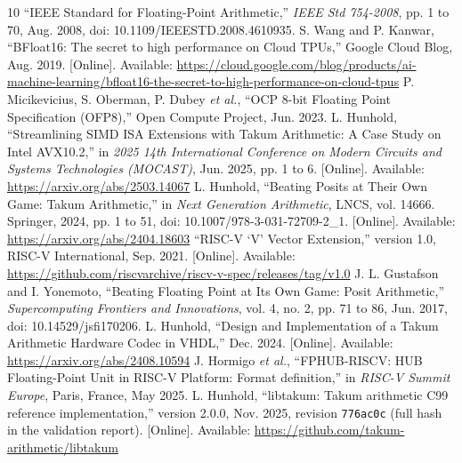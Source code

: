 \documentclass[conference]{IEEEtran}
\newcommand{\code}[1]{\texttt{#1}}
\begin{document}
\begin{thebibliography}{10}
``IEEE Standard for Floating-Point Arithmetic,'' \emph{IEEE Std 754-2008},
pp. 1 to 70, Aug. 2008, doi: 10.1109/IEEESTD.2008.4610935.
S. Wang and P. Kanwar, ``BFloat16: The secret to high performance on Cloud
TPUs,'' Google Cloud Blog, Aug. 2019. [Online]. Available:
\url{https://cloud.google.com/blog/products/ai-machine-learning/bfloat16-the-secret-to-high-performance-on-cloud-tpus}
P. Micikevicius, S. Oberman, P. Dubey \emph{et al.}, ``OCP 8-bit Floating Point
Specification (OFP8),'' Open Compute Project, Jun. 2023.
L. Hunhold, ``Streamlining SIMD ISA Extensions with Takum Arithmetic:
A Case Study on Intel AVX10.2,'' in \emph{2025 14th International Conference on
Modern Circuits and Systems Technologies (MOCAST)}, Jun. 2025, pp. 1 to 6.
[Online]. Available: \url{https://arxiv.org/abs/2503.14067}
L. Hunhold, ``Beating Posits at Their Own Game: Takum Arithmetic,'' in
\emph{Next Generation Arithmetic}, LNCS, vol. 14666. Springer, 2024,
pp. 1 to 51, doi: 10.1007/978-3-031-72709-2\_1.
[Online]. Available: \url{https://arxiv.org/abs/2404.18603}
``RISC-V `V' Vector Extension,'' version 1.0, RISC-V International, Sep. 2021.
[Online]. Available: \url{https://github.com/riscvarchive/riscv-v-spec/releases/tag/v1.0}
J. L. Gustafson and I. Yonemoto, ``Beating Floating Point at Its Own Game:
Posit Arithmetic,'' \emph{Supercomputing Frontiers and Innovations}, vol. 4,
no. 2, pp. 71 to 86, Jun. 2017, doi: 10.14529/jsfi170206.
L. Hunhold, ``Design and Implementation of a Takum Arithmetic Hardware Codec
in VHDL,'' Dec. 2024. [Online]. Available: \url{https://arxiv.org/abs/2408.10594}
J. Hormigo \emph{et al.}, ``FPHUB-RISCV: HUB Floating-Point Unit in RISC-V
Platform: Format definition,'' in \emph{RISC-V Summit Europe}, Paris, France,
May 2025.
L. Hunhold, ``libtakum: Takum arithmetic C99 reference implementation,''
version 2.0.0, Nov. 2025, revision \code{776ac0c} (full hash in the validation
report).
[Online]. Available: \url{https://github.com/takum-arithmetic/libtakum}
\end{thebibliography}
\end{document}
